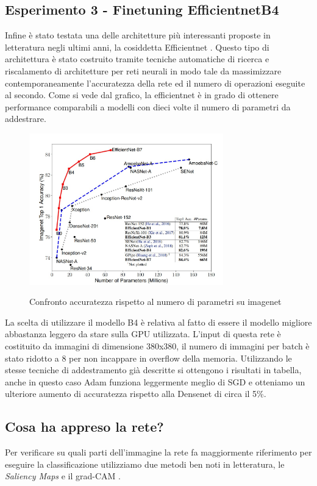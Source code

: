 \subsection{Esperimento 3 - Finetuning EfficientnetB4}
Infine è stato testata una delle architetture più interessanti proposte in letteratura negli ultimi anni, la cosiddetta Efficientnet \cite{tan2019efficientnet}.
Questo tipo di architettura è stato costruito tramite tecniche automatiche di ricerca e riscalamento di architetture per reti neurali in modo tale da massimizzare contemporaneamente l'accuratezza della rete ed il numero di operazioni eseguite al secondo.
Come si vede dal grafico, la efficientnet è in grado di ottenere performance comparabili a modelli con dieci volte il numero di parametri da addestrare. 
\begin{figure}[ht]
\centering
\includegraphics[width=0.75\textwidth]{images/efficientnet} 
\label{fig_efficientnet}
\caption{Confronto accuratezza rispetto al numero di parametri su imagenet}
\end{figure}
La scelta di utilizzare il modello B4 è relativa al fatto di essere il modello migliore abbastanza leggero da stare sulla GPU utilizzata.
L'input di questa rete è costituito da immagini di dimensione 380x380, il numero di immagini per batch è stato ridotto a 8 per non incappare in overflow della memoria.
Utilizzando le stesse tecniche di addestramento già descritte si ottengono i risultati in tabella, anche in questo caso Adam funziona leggermente meglio di SGD e otteniamo un ulteriore aumento di accuratezza rispetto alla Densenet di circa il 5\%.
\subsection{Cosa ha appreso la rete?}
Per verificare su quali parti dell'immagine la rete fa maggiormente riferimento per eseguire la classificazione utilizziamo due metodi ben noti in letteratura, le \textit{Saliency Maps} \cite{simonyan2013deep} e il grad-CAM \cite{Selvaraju_2019}.
